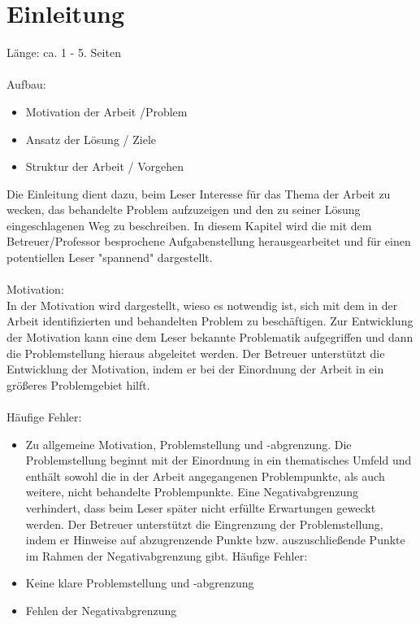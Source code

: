 \chapter{Einleitung}
Länge: ca. 1 - 5. Seiten\\\\

\noindent Aufbau:
\begin{itemize}
	\item Motivation der Arbeit /Problem
	\item Ansatz der Lösung / Ziele
	\item Struktur der Arbeit / Vorgehen
\end{itemize}
Die Einleitung dient dazu, beim Leser Interesse für das Thema der Arbeit zu wecken, das behandelte Problem aufzuzeigen und den zu seiner Lösung eingeschlagenen Weg zu beschreiben. In diesem Kapitel wird die mit dem Betreuer/Professor besprochene Aufgabenstellung herausgearbeitet und für einen potentiellen Leser "spannend" dargestellt.\\\\

\noindent Motivation:\\
In der Motivation wird dargestellt, wieso es notwendig ist, sich mit dem in der Arbeit identifizierten und behandelten Problem zu beschäftigen. Zur Entwicklung der Motivation kann eine dem Leser bekannte Problematik aufgegriffen und dann die Problemstellung hieraus abgeleitet werden. Der Betreuer unterstützt die Entwicklung der Motivation, indem er bei der Einordnung der Arbeit in ein größeres Problemgebiet hilft.\\\\

\noindent Häufige Fehler:
\begin{itemize}
	\item Zu allgemeine Motivation, Problemstellung und -abgrenzung. Die Problemstellung beginnt mit der Einordnung in ein thematisches Umfeld und enthält sowohl die in der Arbeit angegangenen Problempunkte, als auch weitere, nicht behandelte Problempunkte. Eine Negativabgrenzung verhindert, dass beim Leser später nicht erfüllte Erwartungen geweckt werden.
Der Betreuer unterstützt die Eingrenzung der Problemstellung, indem er Hinweise auf abzugrenzende Punkte bzw. auszuschließende Punkte im Rahmen der Negativabgrenzung gibt.
\noindent Häufige Fehler:
	\item Keine klare Problemstellung und -abgrenzung
	\item Fehlen der Negativabgrenzung
\end{itemize}

